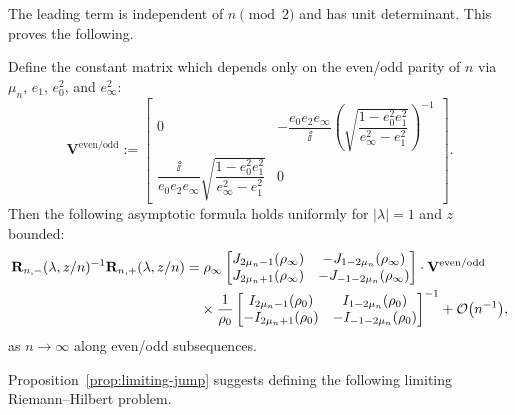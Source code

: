 The leading term is independent of $n\pmod{2}$ and has unit determinant. This proves the following.
\begin{prop}
Define the constant matrix which depends only on the even/odd parity of $n$ via $\mu_n$, $e_1$, $e_0^2$, and $e_\infty^2$:
\begin{equation}
 \mathbf{V}^\mathrm{even/odd}:=\begin{bmatrix} 0 & -\dfrac{e_0 e_2 e_\infty}{\ii} \left(\sqrt{\dfrac{1 - e_0^2 e_1^2}{e_\infty^2-e_1^2 } }\right)^{-1} \\
 \dfrac{ \ii }{e_0 e_2 e_\infty} \sqrt{\dfrac{1 - e_0^2 e_1^2}{e_\infty^2-e_1^2 }} & 0
\end{bmatrix}.
 \label{eq:Vm-even}
\end{equation}
Then the following asymptotic formula holds uniformly for $|\lambda|=1$ and $z$ bounded:
\begin{align*}
& \mathbf{R}_{n,-}(\lambda,z/n)^{-1}\mathbf{R}_{n,+}(\lambda,z/n)= {\rho_\infty}\begin{bmatrix}J_{2\mu_n - 1}(\rho_\infty) & -J_{1- 2\mu_n}(\rho_\infty)\\
 J_{2\mu_n +1}(\rho_\infty) & -J_{-1-2\mu_n}(\rho_\infty)\end{bmatrix}\cdot\mathbf{V}^\mathrm{even/odd}\\
&\hphantom{\mathbf{R}_{n,-}(\lambda,z/n)^{-1}\mathbf{R}_{n,+}(\lambda,z/n)=}{}
\times
 \dfrac{1}{\rho_0}\begin{bmatrix}I_{2\mu_n - 1}(\rho_0) & I_{1- 2\mu_n}(\rho_0)\\
 -I_{2\mu_n +1}(\rho_0) & -I_{-1-2\mu_n}(\rho_0)\end{bmatrix}^{-1}+\mathcal{O}\big(n^{-1}\big),
\end{align*}
as $n\to\infty$ along even/odd subsequences.
\label{prop:limiting-jump}
\end{prop}
Proposition~\ref{prop:limiting-jump} suggests defining the following limiting Riemann--Hilbert problem.
